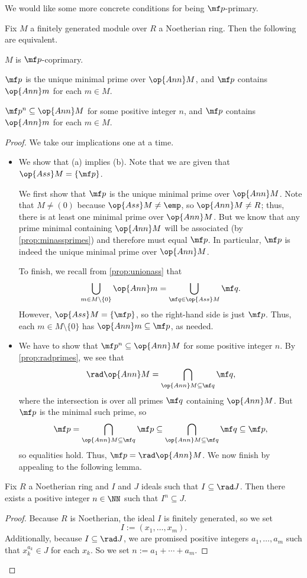 We would like some more concrete conditions for being $\mf p$-primary.
\begin{proposition}
	Fix $M$ a finitely generated module over $R$ a Noetherian ring. Then the following are equivalent.
	\begin{listalph}
		\item $M$ is $\mf p$-coprimary.
		\item $\mf p$ is the unique minimal prime over $\op{Ann}M$, and $\mf p$ contains $\op{Ann}m$ for each $m\in M$. %
		\item $\mf p^n\subseteq\op{Ann}M$ for some positive integer $n$, and $\mf p$ contains $\op{Ann}m$ for each $m\in M$.
	\end{listalph}
\end{proposition}
\begin{proof}
	We take our implications one at a time.
	\begin{itemize}
		\item We show that (a) implies (b). Note that we are given that $\op{Ass}M=\{\mf p\}$.
		
		We first show that $\mf p$ is the unique minimal prime over $\op{Ann}M$. Note that $M\ne(0)$ because $\op{Ass}M\ne\emp$, so $\op{Ann}M\ne R$; thus, there is at least one minimal prime over $\op{Ann}M$. But we know that any prime minimal containing $\op{Ann}M$ will be associated (by \autoref{prop:minassprimes}) and therefore must equal $\mf p$. In particular, $\mf p$ is indeed the unique minimal prime over $\op{Ann}M$.

		To finish, we recall from \autoref{prop:unionass} that
		\[\bigcup_{m\in M\setminus\{0\}}\op{Ann}m=\bigcup_{\mf q\in\op{Ass}M}\mf q.\]
		However, $\op{Ass}M=\{\mf p\}$, so the right-hand side is just $\mf p$. Thus, each $m\in M\setminus\{0\}$ has $\op{Ann}m\subseteq\mf p$, as needed.

		\item We have to show that $\mf p^n\subseteq\op{Ann}M$ for some positive integer $n$. By \autoref{prop:radprimes}, we see that
		\[\rad\op{Ann}M=\bigcap_{\op{Ann}M\subseteq\mf q}\mf q,\]
		where the intersection is over all primes $\mf q$ containing $\op{Ann}M$. But $\mf p$ is the minimal such prime, so
		\[\mf p=\bigcap_{\op{Ann}M\subseteq\mf q}\mf p\subseteq\bigcap_{\op{Ann}M\subseteq\mf q}\mf q\subseteq\mf p,\]
		so equalities hold. Thus, $\mf p=\rad\op{Ann}M$. We now finish by appealing to the following lemma.
	\end{itemize}
	\begin{lemma}
		Fix $R$ a Noetherian ring and $I$ and $J$ ideals such that $I\subseteq\rad J$. Then there exists a positive integer $n\in\NN$ such that $I^n\subseteq J$.
	\end{lemma}
	\begin{proof}
		Because $R$ is Noetherian, the ideal $I$ is finitely generated, so we set
		\[I:=(x_1,\ldots,x_m).\]
		Additionally, because $I\subseteq\rad J$, we are promised positive integers $a_1,\ldots,a_m$ such that $x_k^{a_k}\in J$ for each $x_k$. So we set $n:=a_1+\cdots+a_m$.
		

\end{proof}
\end{proof}
